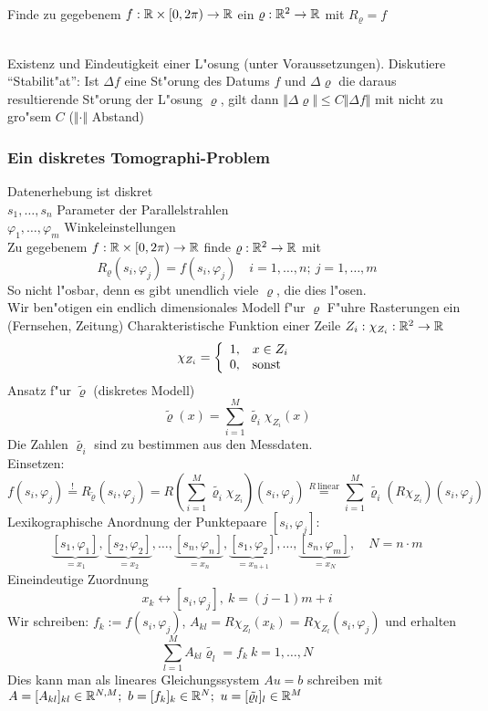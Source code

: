 \documentclass{scrartcl}
\begin{document}
\\
Finde zu gegebenem $f: \mathbb{R} \times [0, 2 \pi ) \rightarrow \mathbb{R}$ ein $\varrho: \mathbb{R}^2 \rightarrow \mathbb{R}$ mit $R_\varrho = f$

 \\
Existenz und Eindeutigkeit einer L"osung (unter Voraussetzungen). Diskutiere "`Stabilit"at"': Ist $\Delta f$ eine St"orung des Datums $f$ und $\Delta \varrho$ die daraus resultierende St"orung der L"osung $\varrho$, gilt dann $ \Vert \Delta \varrho \Vert \leq C \Vert \Delta f \Vert$ mit nicht zu gro"sem $C$ ($\Vert \cdot \Vert$ Abstand)

\subsubsection{Ein diskretes Tomographi-Problem}

Datenerhebung ist diskret \\
$s_1, \ldots, s_n$ Parameter der Parallelstrahlen \\
$\varphi_1, \ldots, \varphi_m$ Winkeleinstellungen \\

 Zu gegebenem $f: \mathbb{R} \times [0, 2 \pi ) \rightarrow \mathbb{R}$ finde $\varrho: \mathbb{R}^2 \rightarrow \mathbb{R}$ mit 
$$ R_\varrho(s_i, \varphi_j) = f(s_i, \varphi_j) \quad i=1,\ldots,n; \ j=1, \ldots, m$$
So nicht l"osbar, denn es gibt unendlich viele $\varrho$, die dies l"osen. \\
Wir ben"otigen ein endlich dimensionales Modell f"ur $\varrho$
 F"uhre Rasterungen ein (Fernsehen, Zeitung)
 Charakteristische Funktion einer Zeile $Z_i: \chi_{Z_i}: \mathbb{R}^2 \rightarrow \mathbb{R}$ 
$$ \chi_{Z_i} = \left\{ \begin{array}{l l} 1, & x \in Z_i \\ 0, & \mathrm{sonst} \end{array} \right. $$
Ansatz f"ur $\tilde{\varrho}$ (diskretes Modell) 
$$ \tilde{\varrho} (x) = \sum\limits_{i=1}^M \tilde{\varrho_i} \chi_{Z_i} (x) $$
Die Zahlen $\tilde{\varrho_i}$ sind zu bestimmen aus den Messdaten. \\
Einsetzen: 
$$f(s_i, \varphi_j) \stackrel{!}{=} R_{\tilde{\varrho}}(s_i, \varphi_j) = R(\sum\limits_{i=1}^M \tilde{\varrho_i} \chi_{Z_i})(s_i, \varphi_j) \stackrel{R \mathrm{ \ linear}}{=} \sum\limits_{i=1}^M \tilde{\varrho_i} (R \chi_{Z_i})(s_i, \varphi_j)$$
Lexikographische Anordnung der Punktepaare 
$[s_i, \varphi_j]$: \\
$$\underbrace{[s_1,\varphi_1]}_{=x_1}, \underbrace{[s_2,\varphi_2]}_{=x_2}, \ldots, \underbrace{[s_n,\varphi_n]}_{=x_n}, \underbrace{[s_1,\varphi_2]}_{=x_{n+1}}, \ldots, \underbrace{[s_n,\varphi_m]}_{=x_N}, \quad N=n\cdot m$$
Eineindeutige Zuordnung 
$$x_k \leftrightarrow [s_i, \varphi_j], \ k=(j-1)m + i$$ 
Wir schreiben: $f_k := f(s_i, \varphi_j)$, $A_{kl} = R \chi_{Z_l} (x_k) = R \chi_{Z_l} (s_i, \varphi_j)$ und erhalten 
$$\sum\limits_{l=1}^M A_{kl} \tilde{\varrho_l} = f_k \ k=1, \ldots, N$$ 
Dies kann man als lineares Gleichungssystem $A u = b$ schreiben mit $A = [ A_{kl} ]_{kl} \in \mathbb{R}^{N,M}; \ b=[f_k]_k \in \mathbb{R}^N; \ u= [\tilde{\varrho_l} ]_l \in \mathbb{R}^M$
\end{document}
